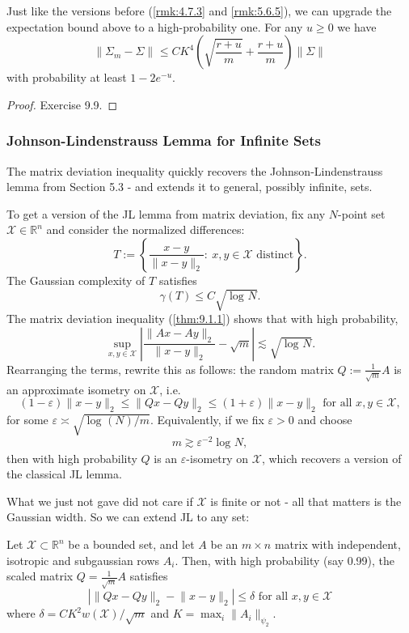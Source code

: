 \begin{remark}
\label{rmk:9.2.4}
Just like the versions before (\cref{rmk:4.7.3} and \cref{rmk:5.6.5}), we can upgrade the expectation bound 
above to a high-probability one. For any $u \geq 0$ we have 
\[ \lVert \Sigma_m - \Sigma \rVert_{} \leq CK^4 \left( 
\sqrt{\frac{r + u}{m}} + \frac{r + u}{m} \right) \lVert \Sigma \rVert_{} \]
with probability at least $1 - 2e^{-u}$. 
\end{remark}

\begin{proof}
Exercise 9.9.
\end{proof}


\subsubsection{Johnson-Lindenstrauss Lemma for Infinite Sets}
The matrix deviation inequality quickly recovers the Johnson-Lindenstrauss lemma from Section 5.3 - and extends 
it to general, possibly infinite, sets.

To get a version of the JL lemma from matrix deviation, fix any $N$-point set $\mathcal{X} \in \mathbb{R}^n$ 
and consider the normalized differences: 
\[ T := \left\{ \frac{x - y}{\lVert x - y \rVert_{2}}: \ x, y \in \mathcal{X} \text{ distinct} \right\}. \]
The Gaussian complexity of $T$ satisfies 
\[ \gamma(T) \leq C \sqrt{\log_{}{N}}. \]
The matrix deviation inequality (\cref{thm:9.1.1}) shows that with high probability, 
\[ \sup_{x, y \in \mathcal{X}} \left| \frac{\lVert Ax - Ay \rVert_{2}}{\lVert x - y \rVert_{2}} - 
\sqrt{m} \right| \lesssim \sqrt{\log_{}{N}}. \]
Rearranging the terms, rewrite this as follows: the random matrix $Q := \frac{1}{\sqrt{m}}A$ is an approximate 
isometry on $\mathcal{X}$, i.e.
\[ (1 - \varepsilon)\lVert x - y \rVert_{2} \leq \lVert Qx - Qy \rVert_{2} \leq (1 + \varepsilon)\lVert x - y
\rVert_{2} \text{ for all } x, y \in \mathcal{X}, \]
for some $\varepsilon \asymp \sqrt{\log_{}{(N)} / m}$. Equivalently, if we fix $\varepsilon > 0$ and choose 
\[ m \gtrsim \varepsilon^{-2} \log_{}{N}, \]
then with high probability $Q$ is an $\varepsilon$-isometry on $\mathcal{X}$, which recovers a version of the 
classical JL lemma.

What we just not gave did not care if $\mathcal{X}$ is finite or not - all that matters is the Gaussian width. 
So we can extend JL to any set:

\begin{lemma}
\label{lem:9.2.4}
Let $\mathcal{X} \subset \mathbb{R}^n$ be a bounded set, and let $A$ be an $m \times n$ matrix with independent, 
isotropic and subgaussian rows $A_i$. Then, with high probability (say 0.99), the scaled matrix $Q = 
\frac{1}{\sqrt{m}}A$ satisfies 
\[ |\lVert Qx - Qy \rVert_{2} - \lVert x - y \rVert_{2}| \leq \delta \text{ for all } x, y \in \mathcal{X} \]
where $\delta = CK^2w(\mathcal{X}) / \sqrt{m}$ and $K = \max_{i}\lVert A_i \rVert_{\psi_2}$.
\end{lemma}

